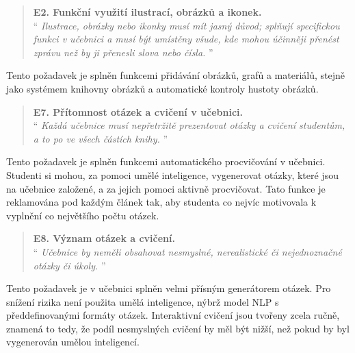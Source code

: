 \documentclass[12pt]{article}
\begin{document}
\filbreak

\begin{samepage}
	\begin{quotation}
		\textbf{E2. Funkční využití ilustrací, obrázků a ikonek.} \\
		\enquote{\textit{
				Ilustrace, obrázky nebo ikonky musí mít jasný důvod; splňují specifickou funkci v učebnici a musí být umístěny všude, kde mohou účinněji přenést zprávu než by ji přenesli slova nebo čísla.
		}}
	\end{quotation}

	Tento požadavek je splněn funkcemi přidávání obrázků, grafů a materiálů, stejně jako systémem knihovny obrázků a automatické kontroly hustoty obrázků.
\end{samepage}

\filbreak

\begin{samepage}
	\begin{quotation}
		\textbf{E7. Přítomnost otázek a cvičení v učebnici.} \\
		\enquote{\textit{
				Každá učebnice musí nepřetržitě prezentovat otázky a cvičení studentům, a to po ve všech částích knihy.
		}}
	\end{quotation}

	Tento požadavek je splněn funkcemi automatického procvičování v učebnici. Studenti si mohou, za pomoci umělé inteligence, vygenerovat otázky, které jsou na učebnice založené, a za jejich pomoci aktivně procvičovat. Tato funkce je reklamována pod každým článek tak, aby studenta co nejvíc motivovala k vyplnění co největšího počtu otázek.
\end{samepage}

\filbreak

\begin{samepage}
	\begin{quotation}
		\textbf{E8. Význam otázek a cvičení.} \\
		\enquote{\textit{
				Učebnice by neměli obsahovat nesmyslné, nerealistické či nejednoznačné otázky či úkoly.
		}}
	\end{quotation}

	Tento požadavek je v učebnici splněn velmi přísným generátorem otázek. Pro snížení rizika není použita umělá inteligence, nýbrž model NLP s předdefinovanými formáty otázek.
	Interaktivní cvičení jsou tvořeny zcela ručně, znamená to tedy, že podíl nesmyslných cvičení by měl být nižší, než pokud by byl vygenerován umělou inteligencí.
\end{samepage}
\end{document}
